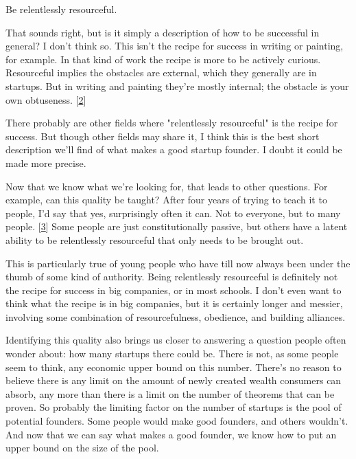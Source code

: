Be relentlessly
                    resourceful.

That sounds right, but is it simply
                    a description of how to be successful in general? I don't
                    think so. This isn't the recipe for success in writing or
                    painting, for example. In that kind of work the recipe is
                    more to be actively curious. Resourceful implies the
                    obstacles are external, which they generally are in
                    startups. But in writing and painting they're mostly
                    internal; the obstacle is your own obtuseness.
                    [\href{\#f2n}{2}]

There probably are other fields where
                    "relentlessly resourceful" is the recipe for success. But
                    though other fields may share it, I think this is the best
                    short description we'll find of what makes a good startup
                    founder. I doubt it could be made more precise.

Now
                    that we know what we're looking for, that leads to other
                    questions. For example, can this quality be taught? After
                    four years of trying to teach it to people, I'd say that
                    yes, surprisingly often it can. Not to everyone, but to many
                    people.
                    [\href{\#f3n}{3}]
                    Some people are just constitutionally passive, but others
                    have a latent ability to be relentlessly resourceful that
                    only needs to be brought out.

This is
                    particularly true of young people who have till now always
                    been under the thumb of some kind of authority. Being
                    relentlessly resourceful is definitely not the recipe for
                    success in big companies, or in most schools. I don't even
                    want to think what the recipe is in big companies, but it is
                    certainly longer and messier, involving some combination of
                    resourcefulness, obedience, and building alliances.

Identifying
                    this quality also brings us closer to answering a question
                    people often wonder about: how many startups there could be.
                    There is not, as some people seem to think, any economic
                    upper bound on this number. There's no reason to believe
                    there is any limit on the amount of newly created wealth
                    consumers can absorb, any more than there is a limit on the
                    number of theorems that can be proven. So probably the
                    limiting factor on the number of startups is the pool of
                    potential founders. Some people would make good founders,
                    and others wouldn't. And now that we can say what makes a
                    good founder, we know how to put an upper bound on the size
                    of the pool.

